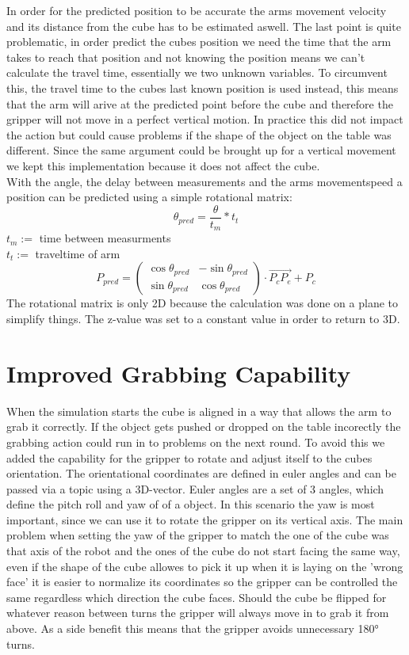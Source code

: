 \documentclass[report]{iisthesis}
\begin{document}
In order for the predicted position to be accurate the arms movement velocity and its distance from the cube has to be estimated aswell.
The last point is quite problematic, in order predict the cubes position we need the time that the arm takes to reach that position and not knowing the position means we can't calculate the travel time, 
essentially we two unknown variables.
To circumvent this, the travel time to the cubes last known position is used instead, this means that the arm will arive at the predicted point before the cube 
and therefore the gripper will not move in a perfect vertical motion. In practice this did not impact the action but could cause problems if the shape of the object on the table was different.
Since the same argument could be brought up for a vertical movement we kept this implementation because it does not affect the cube. \\
With the angle, the delay between measurements and the arms movementspeed a position can be predicted using a simple rotational matrix:
$$
\theta_{pred} = \frac{\theta}{t_m} * t_t
$$
$t_m :=$ time between measurments \\
$t_t :=$ traveltime of arm 
$$
P_{pred} =
\begin{pmatrix}
    \cos\theta_{pred} & -\sin\theta_{pred} \\
    \sin\theta_{pred} & \cos\theta_{pred}
\end{pmatrix}
\cdot \overrightarrow{P_cP_e}
+ P_c
$$
The rotational matrix is only 2D because the calculation was done on a plane to simplify things. The z-value was set to a constant value in order to return to 3D. 

\section{Improved Grabbing Capability}
When the simulation starts the cube is aligned in a way that allows the arm to grab it correctly. If the object gets pushed or dropped on the table incorectly the grabbing action could run in to problems
on the next round. To avoid this we added the capability for the gripper to rotate and adjust itself to the cubes orientation.
The orientational coordinates are defined in euler angles and can be passed via a topic using a 3D-vector.
Euler angles are a set of 3 angles, which define the pitch roll and yaw of of a object. In this scenario the yaw is most important, since we can use it to rotate the gripper on its vertical axis.
The main problem when setting the yaw of the gripper to match the one of the cube was that axis of the robot and the ones of the cube do not start facing the same way, even if the shape of the cube allowes 
to pick it up when it is laying on the 'wrong face' it is easier to normalize its coordinates so the gripper can be controlled the same regardless which direction the cube faces. 
Should the cube be flipped for whatever reason between turns the gripper will always move in to grab it from above.
As a side benefit this means that the gripper avoids unnecessary 180° turns.
\end{document}
